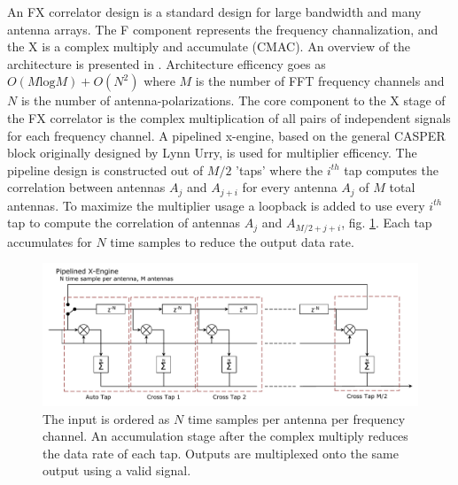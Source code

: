 \documentclass[useAMS,usenatbib,onecolumn]{mn2e}
\begin{document}
An FX correlator design is a standard design for large bandwidth and many antenna arrays.
The F component represents the frequency channalization, and the X is a complex multiply and accumulate (CMAC).
An overview of the architecture is presented in \citep{}.
Architecture efficency goes as $O( M \textrm{log} M) + O( N^2)$ where $M$ is the number of FFT frequency channels and $N$ is the number of antenna-polarizations.
The core component to the X stage of the FX correlator is the complex multiplication of all pairs of independent signals for each frequency channel.
A pipelined x-engine, based on the general CASPER block originally designed by Lynn Urry\citep{}, is used for multiplier efficency.
The pipeline design is constructed out of $M/2$ 'taps' where the $i^{th}$ tap computes the correlation between antennas $A_j$ and $A_{j+i}$ for every antenna $A_j$ of $M$ total antennas.
To maximize the multiplier usage a loopback is added to use every $i^{th}$ tap to compute the correlation of antennas $A_j$ and $A_{M/2+j+i}$, fig. \ref{fig:xeng_pipe}.
Each tap accumulates for $N$ time samples to reduce the output data rate.

\begin{figure}
    \centering
    \includegraphics[scale=0.6]{graphics/crop_pipelined_xeng.pdf}
    \caption{The input is ordered as $N$ time samples per antenna per frequency channel. An accumulation stage after the complex multiply reduces the data rate of each tap. Outputs are multiplexed onto the same output using a valid signal.}
    \label{fig:xeng_pipe}
\end{figure}
\end{document}
